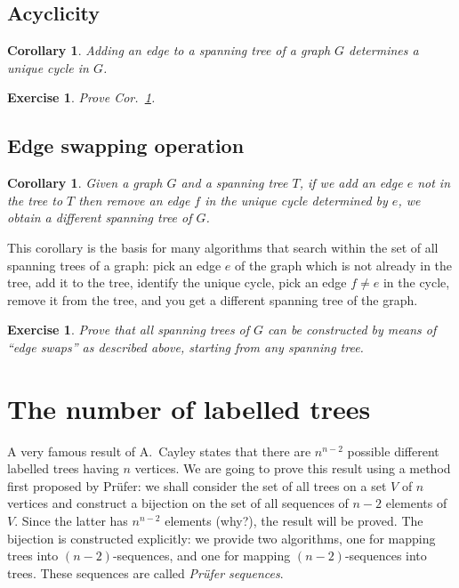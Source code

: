 \documentclass[a4paper]{book}
\theoremstyle{changebreak}                %
\newtheorem{cor}[result]{Corollary}
\newtheorem{ex}[result]{Exercise}
\begin{document}
\subsection{Acyclicity}
\begin{cor}
Adding an edge to a spanning tree of a graph $G$
determines a unique cycle in $G$.
\label{cor:uniqcyc}
\end{cor}

\begin{ex}
Prove Cor.~\ref{cor:uniqcyc}.
\end{ex}

\subsection{Edge swapping operation}
\begin{cor}
Given a graph $G$ and a spanning tree $T$, if we add an edge $e$ 
not in the tree to $T$ then remove an edge $f$ in the unique 
cycle determined by $e$, we obtain a different spanning tree of $G$.
\end{cor}
This corollary is the basis for many algorithms that search within the
set of all spanning trees of a graph: pick an edge $e$ of the graph
which is not already in the tree, add it to the tree, identify the
unique cycle, pick an edge $f\not=e$ in the cycle, remove it from the
tree, and you get a different spanning tree of the graph.

\begin{ex}
Prove that all spanning trees of $G$ can be constructed by means 
of ``edge swaps'' as described above, starting from any 
spanning tree.
\end{ex}

\section{The number of labelled trees}
A very famous result of A.~Cayley states that there are
$n^{n-2}$ possible different labelled trees
having $n$ vertices. We are going to prove this result using a method
first proposed by Pr\"ufer: we shall consider the set
of all trees on a set $V$ of $n$ vertices and construct a bijection on
the set of all sequences of $n-2$ elements of $V$. Since the latter
has $n^{n-2}$ elements (why?), the result will be proved. The
bijection is constructed explicitly: we provide two algorithms, one
for mapping trees into $(n-2)$-sequences, and one for mapping
$(n-2)$-sequences into trees. These sequences are called {\it Pr\"ufer
  sequences}.
\end{document}
